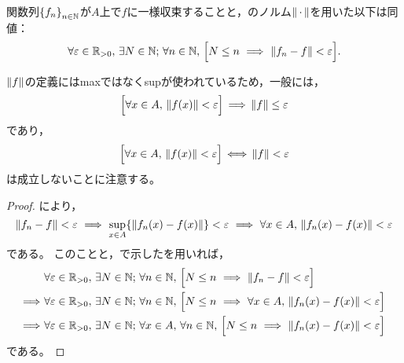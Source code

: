 \documentclass[b5paper,draft]{ltjsbook}
\begin{document}
\begin{prop}
    関数列$\seq{f_n}{n\in\N}$が$A$上で$f$に一様収束することと，のノルム$\norm{\dummy}$を用いた以下は同値：
    \begin{equation}
        \forall\varepsilon\in\Rposi,\, \exists N\in\N;\,
        \forall n\in\N,\, \bsqu{N\leq n\ \Longrightarrow\ \norm{f_n-f}<\varepsilon}.
    \end{equation}
    \begin{policy}
        $\norm{f}$の定義にはmaxではなくsupが使われているため，一般には，
        \begin{equation}
            \bsqu{\forall x\in A,\, \norm{\fun{f}{x}}<\varepsilon}\, \Longrightarrow\, \norm{f}\leq \varepsilon
        \end{equation}
        であり，
        \begin{equation}
            \bsqu{\forall x\in A,\, \norm{\fun{f}{x}}<\varepsilon}\, \Longleftrightarrow\, \norm{f}< \varepsilon
        \end{equation}
        は成立しないことに注意する。
    \end{policy}
    \begin{proof}
        により，
        \begin{equation}
            \norm{f_n-f}<\varepsilon\ \Longrightarrow\ \sup_{x\in A}\bra{\norm{\fun{f_n}{x}-\fun{f}{x}}}<\varepsilon\ \Longrightarrow\ \forall x\in A,\, \norm{\fun{f_n}{x}-\fun{f}{x}}<\varepsilon
        \end{equation}
        である。
        このことと，で示したを用いれば，
        \begin{align}
            &\forall\varepsilon\in\Rposi,\, \exists N\in\N;\,
            \forall n\in\N,\, \bsqu{N\leq n\ \Longrightarrow\ \norm{f_n-f}<\varepsilon}
            \\
            \Longrightarrow\
            &\forall\varepsilon\in\Rposi,\, \exists N\in\N;\,
            \forall n\in\N,\, \bsqu{N\leq n\ \Longrightarrow\ \forall x\in A,\, \norm{\fun{f_n}{x}-\fun{f}{x}}<\varepsilon}
            \\
            \Longrightarrow\
            &\forall\varepsilon\in\Rposi,\, \exists N\in\N;\, \forall x\in A,\,
            \forall n\in \N,\, \bsqu{N\leq n\ \Longrightarrow\ \norm{\fun{f_n}{x}-\fun{f}{x}}<\varepsilon}
        \end{align}
        である。


\end{proof}
\end{prop}
\end{document}
